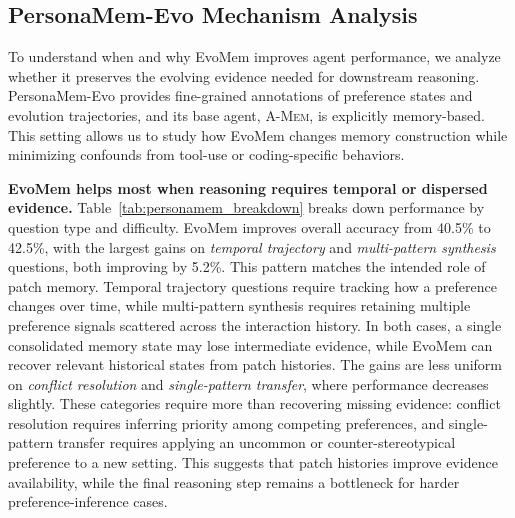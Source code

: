 \documentclass{article}
\begin{document}
\subsection{PersonaMem-Evo Mechanism Analysis}

To understand when and why EvoMem improves agent performance, we analyze whether it preserves the evolving evidence needed for downstream reasoning. PersonaMem-Evo provides fine-grained annotations of preference states and evolution trajectories, and its base agent, \textsc{A-Mem}, is explicitly memory-based. 
This setting allows us to study how EvoMem changes memory construction while minimizing confounds from tool-use or coding-specific behaviors. 




\textbf{EvoMem helps most when reasoning requires temporal or dispersed evidence.} \quad
Table~\ref{tab:personamem_breakdown} breaks down performance by question type and difficulty. EvoMem improves overall accuracy from 40.5\% to 42.5\%, with the largest gains on \emph{temporal trajectory} and \emph{multi-pattern synthesis} questions, both improving by 5.2\%. This pattern matches the intended role of patch memory. Temporal trajectory questions require tracking how a preference changes over time, while multi-pattern synthesis requires retaining multiple preference signals scattered across the interaction history. In both cases, a single consolidated memory state may lose intermediate evidence, while EvoMem can recover relevant historical states from patch histories. The gains are less uniform on \emph{conflict resolution} and \emph{single-pattern transfer}, where performance decreases slightly. These categories require more than recovering missing evidence: conflict resolution requires inferring priority among competing preferences, and single-pattern transfer requires applying an uncommon or counter-stereotypical preference to a new setting. This suggests that patch histories improve evidence availability, while the final reasoning step remains a bottleneck for harder preference-inference cases.
\end{document}
